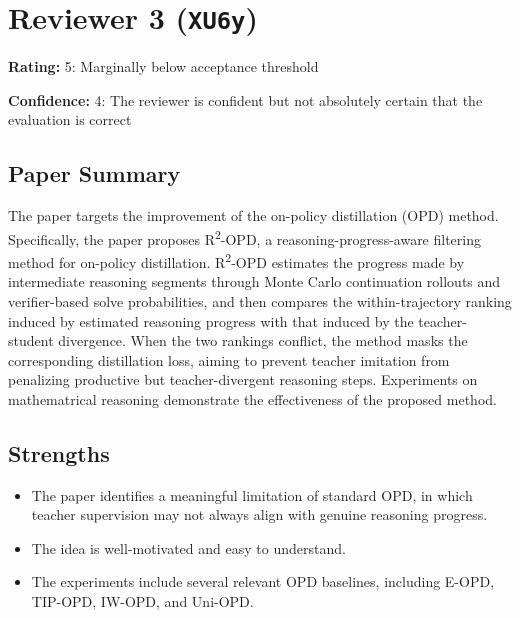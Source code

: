 \section{Reviewer 3 (\texttt{XU6y})}
\label{reviewer:3}
\noindent\textbf{Rating:} 5: Marginally below acceptance threshold\par
\noindent\textbf{Confidence:} 4: The reviewer is confident but not absolutely certain that the evaluation is correct

\subsection*{Paper Summary}
The paper targets the improvement of the on-policy distillation (OPD) method. Specifically, the paper proposes R\textsuperscript{2}-OPD, a reasoning-progress-aware filtering method for on-policy distillation. R\textsuperscript{2}-OPD estimates the progress made by intermediate reasoning segments through Monte Carlo continuation rollouts and verifier-based solve probabilities, and then compares the within-trajectory ranking induced by estimated reasoning progress with that induced by the teacher-student divergence. When the two rankings conflict, the method masks the corresponding distillation loss, aiming to prevent teacher imitation from penalizing productive but teacher-divergent reasoning steps. Experiments on mathematrical reasoning demonstrate the effectiveness of the proposed method.

\subsection*{Strengths}
\begin{itemize}
\item The paper identifies a meaningful limitation of standard OPD, in which teacher supervision may not always align with genuine reasoning progress.
\item The idea is well-motivated and easy to understand.
\item The experiments include several relevant OPD baselines, including E-OPD, TIP-OPD, IW-OPD, and Uni-OPD.
\end{itemize}

